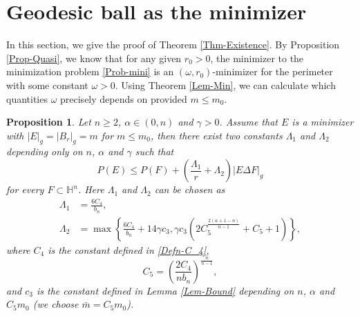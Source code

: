 \documentclass[11pt,reqno]{amsart}
\newtheorem{prop}[thm]{Proposition}
\theoremstyle{definition}
\theoremstyle{remark}
\numberwithin{equation}{section}
\renewcommand{\(}{\left(}
\renewcommand{\)}{\right)}
\renewcommand{\-}{\overline}
\begin{document}
\section{Geodesic ball as the minimizer}\label{Sec-Ball}
In this section, we give the proof of Theorem \ref{Thm-Existence}. By Proposition \ref{Prop-Quasi}, we know that for any given $r_0>0$, the minimizer to the minimization problem \eqref{Prob-mini} is an $(\omega,r_0)$-minimizer for the perimeter with some constant $\omega>0$. Using Theorem \ref{Lem-Min}, we can calculate which quantities $\omega$ precisely depends on provided $m\leq m_0$.
\begin{prop}\label{Prop-Qp}
	Let $n\geq 2$, $\alpha\in(0,n)$ and $\gamma>0$. Assume that $E$ is a minimizer with $|E|_g=|B_r|_g=m$ for $m\leq m_0$, then there exist two constants $\Lambda_1$ and $\Lambda_2$ depending only on $n$, $\alpha$ and $\gamma$ such that
\begin{equation}\label{In-Qp}
	P(E)\leq P(F)+\left(\frac{\Lambda_1}{r}+\Lambda_2\right)|E\Delta F|_g
\end{equation}
for every $F\subset\mathbb{H}^n$. Here $\Lambda_1$ and $\Lambda_2$ can be chosen as 
\begin{align}
	\Lambda_1&=\frac{6C_4}{b_n},\label{Defin-Lamb1}\\
	\Lambda_2&=\max\left\{\frac{6C_4}{b_n}+14\gamma c_3,\gamma c_3\left(2C_5^{\frac{2(\alpha+1-n)}{n-1}}+C_5+1\right)\right\},\label{Defin-Lamb2}
\end{align}
where $C_4$ is the constant defined in \eqref{Defn-C_4},
\begin{equation}\label{Defn-C5}
	C_5=\left(\frac{2C_4}{nb_n}\right)^{\frac{n}{n-1}},
\end{equation}
and $c_3$ is the constant defined in Lemma \ref{Lem-Bound} depending on $n$, $\alpha$ and $C_5 m_0$ (we choose $\bar{m}=C_5 m_0$).
\end{prop}
\end{document}
